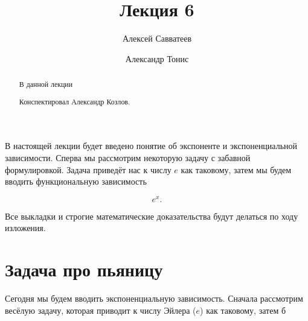 \documentclass[12pt]{article}
\title{Лекция 6}
\author{Алексей Савватеев \and Александр Тонис}
\begin{document}
\maketitle
\begin{abstract}
В данной лекции
\par
Конспектировал Александр Козлов. 
\end{abstract}
\newpage
\tableofcontents
\newpage
В настоящей лекции будет введено понятие об экспоненте и экспоненциальной зависимости. Сперва мы рассмотрим некоторую задачу с забавной формулировкой. Задача приведёт нас к числу $e$ как таковому, затем мы будем вводить функциональную зависимость

\begin{equation}
	e^x.
\end{equation}

Все выкладки и строгие математические доказательства будут делаться по ходу изложения.

\section{Задача про пьяницу}

Сегодня мы будем вводить экспоненциальную зависимость. Сначала рассмотрим весёлую задачу, которая приводит к числу Эйлера ($e$) как таковому, затем б
\end{document}
